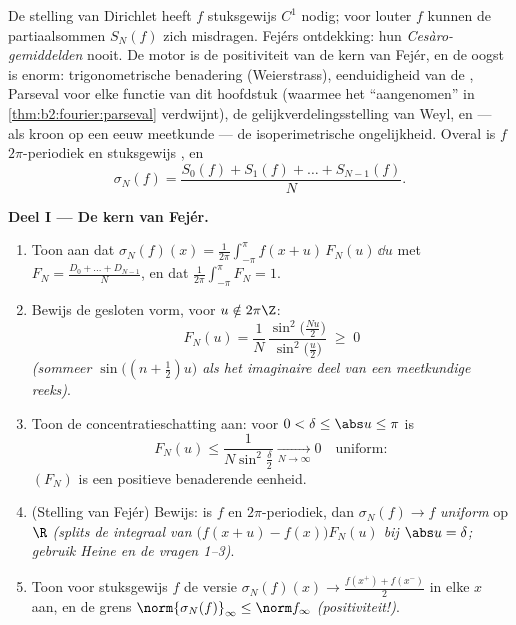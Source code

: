 \begin{problem}\label{pb:b2:fourier:1}
De stelling van Dirichlet heeft $f$ stuksgewijs $C^1$ nodig; voor
louter  $f$ kunnen de partiaalsommen $S_N(f)$ zich
misdragen. Fejérs ontdekking: hun \emph{Cesàro-gemiddelden} nooit.
De motor is de positiviteit van de kern van Fejér, en de oogst is
enorm:  trigonometrische benadering (Weierstrass),
eenduidigheid van de , Parseval voor elke
functie van dit hoofdstuk (waarmee het ``aangenomen'' in
\cref{thm:b2:fourier:parseval} verdwijnt), de
gelijkverdelingsstelling van Weyl, en --- als kroon op een eeuw
meetkunde --- de isoperimetrische ongelijkheid. Overal is $f$ $2\pi$-periodiek en stuksgewijs
, en
\[
\sigma_N(f) = \frac{S_0(f) + S_1(f) + \dots +
S_{N-1}(f)}{N} .
\]

\medskip
\noindent\textbf{Deel I --- De kern van Fejér.}
\begin{enumerate}
  \item Toon aan dat $\sigma_N(f)(x) =
        \frac{1}{2\pi}\int_{-\pi}^{\pi}f(x+u)\,F_N(u)\,\dd u$ met
        $F_N = \frac{D_0 + \dots + D_{N-1}}{N}$, en dat
        $\frac{1}{2\pi}\int_{-\pi}^{\pi}F_N = 1$.
  \item Bewijs de gesloten vorm, voor $u \notin 2\pi\Z$:
        \[
        F_N(u) = \frac{1}{N}\,
        \frac{\sin^2\bigl(\frac{Nu}{2}\bigr)}
        {\sin^2\bigl(\frac u2\bigr)} \;\geq\; 0
        \]
        \emph{(sommeer $\sin\bigl((n+\frac12)u\bigr)$ als het
        imaginaire deel van een meetkundige reeks)}.
  \item Toon de concentratieschatting aan: voor $0 < \delta \leq
        \abs u \leq \pi$ is
        \[
        F_N(u) \leq \frac{1}{N\sin^2\frac\delta2}
        \xrightarrow[N\to\infty]{} 0
        \quad\text{uniform} :
        \]
        $(F_N)$ is een positieve benaderende eenheid.
  \item (Stelling van Fejér) Bewijs: is $f$  en
        $2\pi$-periodiek, dan $\sigma_N(f) \to f$
        \emph{uniform} op $\R$ \emph{(splits de integraal van
        $\bigl(f(x+u) - f(x)\bigr)F_N(u)$ bij $\abs u = \delta$;
        gebruik Heine en de vragen 1--3)}.
  \item Toon voor stuksgewijs  $f$ de  versie
        $\sigma_N(f)(x) \to \frac{f(x^+) + f(x^-)}{2}$ in elke $x$
        aan, en de  grens $\norm{\sigma_N(f)}_\infty \leq
        \norm f_\infty$ \emph{(positiviteit!)}.
\end{enumerate}


\end{problem}

